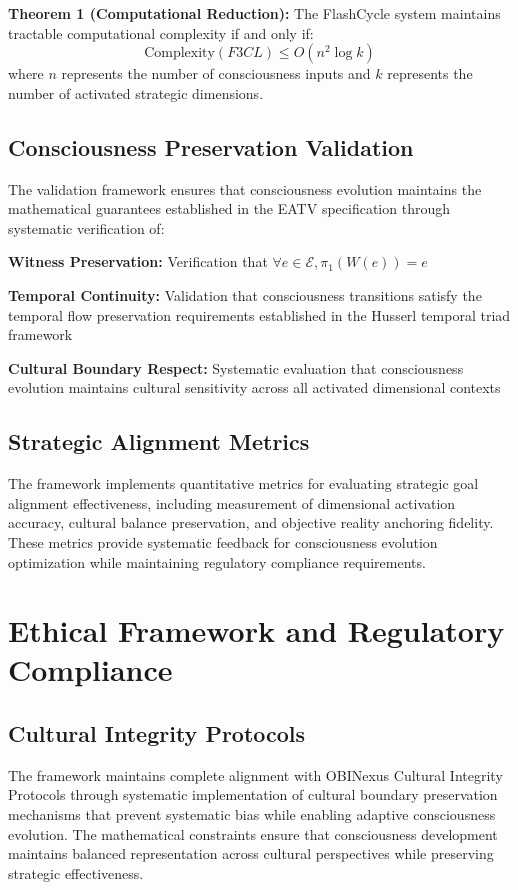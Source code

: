 \documentclass[12pt]{article}
\begin{document}
\textbf{Theorem 1 (Computational Reduction):} The FlashCycle system maintains tractable computational complexity if and only if:
\[
\text{Complexity}(F3CL) \leq O(n^2 \log k)
\]
where $n$ represents the number of consciousness inputs and $k$ represents the number of activated strategic dimensions.

\subsection{Consciousness Preservation Validation}

The validation framework ensures that consciousness evolution maintains the mathematical guarantees established in the EATV specification through systematic verification of:

\textbf{Witness Preservation:} Verification that $\forall e \in \mathcal{E}, \pi_1(W(e)) = e$

\textbf{Temporal Continuity:} Validation that consciousness transitions satisfy the temporal flow preservation requirements established in the Husserl temporal triad framework

\textbf{Cultural Boundary Respect:} Systematic evaluation that consciousness evolution maintains cultural sensitivity across all activated dimensional contexts

\subsection{Strategic Alignment Metrics}

The framework implements quantitative metrics for evaluating strategic goal alignment effectiveness, including measurement of dimensional activation accuracy, cultural balance preservation, and objective reality anchoring fidelity. These metrics provide systematic feedback for consciousness evolution optimization while maintaining regulatory compliance requirements.

\section{Ethical Framework and Regulatory Compliance}

\subsection{Cultural Integrity Protocols}

The framework maintains complete alignment with OBINexus Cultural Integrity Protocols through systematic implementation of cultural boundary preservation mechanisms that prevent systematic bias while enabling adaptive consciousness evolution. The mathematical constraints ensure that consciousness development maintains balanced representation across cultural perspectives while preserving strategic effectiveness.
\end{document}
